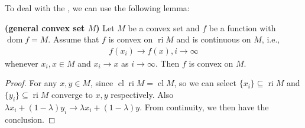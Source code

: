 \documentclass{article}
\newcommand{\bfs}[1]{\textbf{({#1}) }}
\newcommand{\cl}{\operatorname{cl}}
\newcommand{\ri}{\operatorname{ri}}
\newcommand{\dom}{\operatorname{dom}}
\begin{document}
To deal with the , we can use the following lemma:

\begin{lema}{\bfs{general convex set $M$}}\label{lem:setm}
Let $M$ be a convex set and $f$ be a function with  $\dom f=M .$ Assume that $f$ is convex on  $\ri M$ and is continuous on $M$, i.e.,
\begin{align*}
f\left(x_{i}\right) \rightarrow f(x), i \rightarrow \infty
\end{align*}
whenever $x_{i}, x \in M$ and $x_{i} \rightarrow x$ as $i \rightarrow \infty$. Then $f$ is convex on $M$.
\end{lema}
\begin{proof}\color{ForestGreen}
For any $x,y\in M$, since $\cl \ri M = \cl M$, so we can select $\{x_i\}\subseteq \ri M$ and $\{y_i\}\subseteq \ri M$ converge to $x, y$ respectively. Also $\lambda x_i+(1-\lambda)y_i\to \lambda x_i +(1-\lambda)y$. From continuity, we then have the conclusion.
\end{proof}
\end{document}
